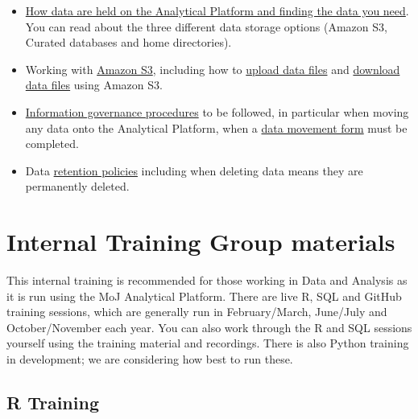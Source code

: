 \documentclass[
]{book}
\providecommand{\tightlist}{%
  \setlength{\itemsep}{0pt}\setlength{\parskip}{0pt}}
\begin{document}
\begin{itemize}
\tightlist
\item
  \href{https://user-guidance.services.alpha.mojanalytics.xyz/data/\#dropShadow}{How data are held on the Analytical Platform and finding the data you need}. You can read about the three different data storage options (Amazon S3, Curated databases and home directories).
\item
  Working with \href{https://user-guidance.services.alpha.mojanalytics.xyz/data/amazon-s3/\#amazon-s3}{Amazon S3}, including how to \href{https://user-guidance.services.alpha.mojanalytics.xyz/data/amazon-s3/\#upload-files-to-amazon-s3}{upload data files} and \href{https://user-guidance.services.alpha.mojanalytics.xyz/data/amazon-s3/\#download-or-read-files-from-amazon-s3}{download data files} using Amazon S3.
\item
  \href{https://user-guidance.services.alpha.mojanalytics.xyz/information-governance.html\#content}{Information governance procedures} to be followed, in particular when moving any data onto the Analytical Platform, when a \href{https://user-guidance.services.alpha.mojanalytics.xyz/information-governance.html\#data-movement-form}{data movement form} must be completed.
\item
  Data \href{https://user-guidance.services.alpha.mojanalytics.xyz/information-governance.html\#data-retention}{retention policies} including when deleting data means they are permanently deleted.
\end{itemize}

\hypertarget{ITG}{%
\chapter{Internal Training Group materials}\label{ITG}}

This internal training is recommended for those working in Data and Analysis as it is run using the MoJ Analytical Platform. There are live R, SQL and GitHub training sessions, which are generally run in February/March, June/July and October/November each year. You can also work through the R and SQL sessions yourself using the training material and recordings. There is also Python training in development; we are considering how best to run these.

\hypertarget{r-training}{%
\section{R Training}\label{r-training}}
\end{document}

